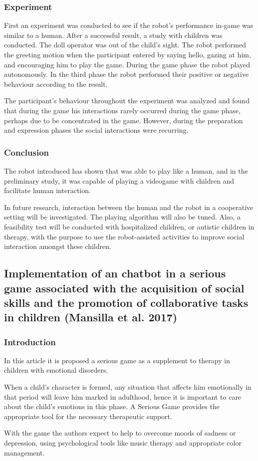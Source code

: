 \documentclass[runningheads]{llncs}
\begin{document}
\subsubsection{Experiment}
\par First an experiment was conducted to see if the robot's performance in-game was similar to a human. After a successful result, a study with children was conducted. The doll operator was out of the child's sight. The robot performed the greeting motion when the participant entered by saying hello, gazing at him, and encouraging him to play the game. During the game phase the robot played autonomously. In the third phase the robot performed their positive or negative behaviour according to the result.
\par The participant's behaviour throughout the experiment was analyzed and found that during the game his interactions rarely occurred during the game phase, perhaps due to be concentrated in the game. However, during the preparation and expression phases the social interactions were recurring.

\subsubsection{Conclusion}
\par The robot introduced has shown that was able to play like a human, and in the preliminary study, it was capable of playing a videogame with children and facilitate human interaction.
\par In future research, interaction between the human and the robot in a cooperative setting will be investigated. The playing algorithm will also be tuned. Also, a feasibility test will be conducted with hospitalized children, or autistic children in therapy, with the purpose to use the robot-assisted activities to improve social interaction amongst these children.


\subsection{Implementation of an chatbot in a serious game associated with the acquisition of social skills and the promotion of collaborative tasks in children (Mansilla et al. 2017)}

\subsubsection{Introduction}
\par In this article it is proposed a serious game as a supplement to therapy in children with emotional disorders. 
\par When a child's character is formed, any situation that affects him emotionally in that period will leave him marked in adulthood, hence it is important to care about the child's emotions in this phase. A Serious Game provides the appropriate tool for the necessary therapeutic support.
\par With the game the authors expect to help to overcome moods of sadness or depression, using psychological tools like music therapy and appropriate color management.
\end{document}
